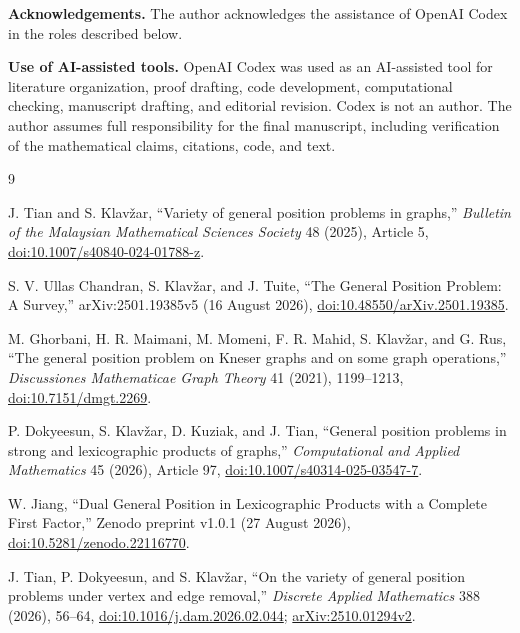 \documentclass[11pt,a4paper]{article}
\numberwithin{equation}{section}
\begin{document}
\medskip
\noindent\textbf{Acknowledgements.}
The author acknowledges the assistance of OpenAI Codex in the roles described
below.

\medskip
\noindent\textbf{Use of AI-assisted tools.}
OpenAI Codex was used as an AI-assisted tool for literature organization,
proof drafting, code development, computational checking, manuscript drafting,
and editorial revision. Codex is not an author. The author assumes full
responsibility for the final manuscript, including verification of the
mathematical claims, citations, code, and text.

\clearpage
\begin{thebibliography}{9}

J. Tian and S. Klav\v{z}ar, ``Variety of general position problems
in graphs,'' \emph{Bulletin of the Malaysian Mathematical Sciences
Society} 48 (2025), Article 5,
\href{https://doi.org/10.1007/s40840-024-01788-z}{doi:10.1007/s40840-024-\mbox{01788-z}}.

S. V. Ullas Chandran, S. Klav\v{z}ar, and J. Tuite, ``The General
Position Problem: A Survey,'' arXiv:2501.19385v5 (16 August 2026),
\href{https://doi.org/10.48550/arXiv.2501.19385}{doi:10.48550/arXiv.2501.19385}.

M. Ghorbani, H. R. Maimani, M. Momeni, F. R. Mahid, S. Klav\v{z}ar,
and G. Rus, ``The general position problem on Kneser graphs and on some
graph operations,'' \emph{Discussiones Mathematicae Graph Theory} 41
(2021), 1199--1213,
\href{https://doi.org/10.7151/dmgt.2269}{doi:10.7151/dmgt.2269}.

P. Dokyeesun, S. Klav\v{z}ar, D. Kuziak, and J. Tian, ``General
position problems in strong and lexicographic products of graphs,''
\emph{Computational and Applied Mathematics} 45 (2026), Article 97,
\href{https://doi.org/10.1007/s40314-025-03547-7}{doi:10.1007/s40314-025-03547-7}.

W. Jiang, ``Dual General Position in Lexicographic Products with
a Complete First Factor,'' Zenodo preprint v1.0.1 (27 August 2026),
\href{https://doi.org/10.5281/zenodo.22116770}{doi:10.5281/zenodo.22116770}.

J. Tian, P. Dokyeesun, and S. Klav\v{z}ar, ``On the variety of
general position problems under vertex and edge removal,''
\emph{Discrete Applied Mathematics} 388 (2026), 56--64,
\href{https://doi.org/10.1016/j.dam.2026.02.044}{doi:10.1016/j.dam.2026.02.044};
\href{https://arxiv.org/abs/2510.01294v2}{arXiv:2510.01294v2}.

\end{thebibliography}
\end{document}
